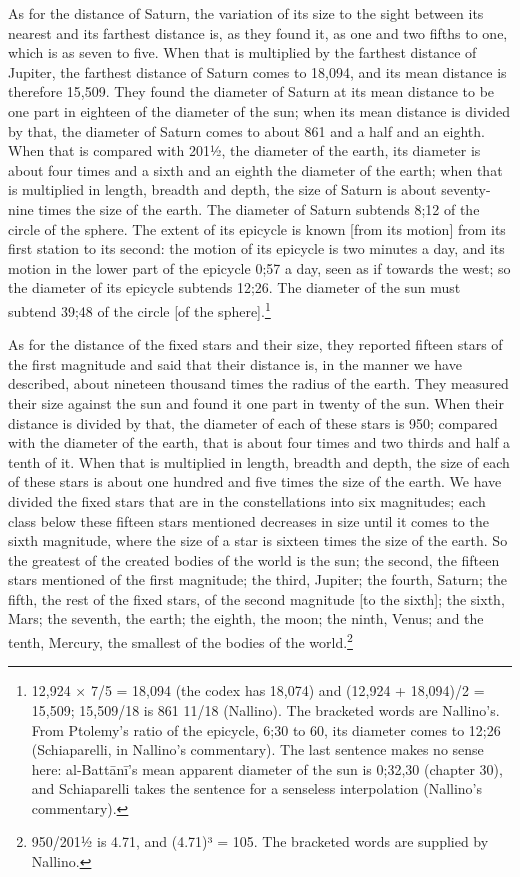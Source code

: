 \documentclass[11pt]{article}
\newcommand{\ArPage}[1]{\marginpar{\footnotesize\color{gray}Ar.\,p.\,#1}}
\begin{document}
\par \ArPage{185}As for the distance of Saturn, the variation of its size to the sight between its nearest and its farthest distance is, as they found it, as one and two fifths to one, which is as seven to five. When that is multiplied by the farthest distance of Jupiter, the farthest distance of Saturn comes to 18,094, and its mean distance is therefore 15,509. They found the diameter of Saturn at its mean distance to be one part in eighteen of the diameter of the sun; when its mean distance is divided by that, the diameter of Saturn comes to about 861 and a half and an eighth. When that is compared with 201½, the diameter of the earth, its diameter is about four times and a sixth and an eighth the diameter of the earth; when that is multiplied in length, breadth and depth, the size of Saturn is about seventy-nine times the size of the earth. The diameter of Saturn subtends 8;12 of the circle of the sphere. The extent of its epicycle is known [from its motion] from its first station to its second: the motion of its epicycle is two minutes a day, and its motion in the lower part of the epicycle 0;57 a day, seen as if towards the west; so the diameter of its epicycle subtends 12;26. The diameter of the sun must subtend 39;48 of the circle [of the sphere].\footnote{12,924 × 7/5 = 18,094 (the codex has 18,074) and (12,924 + 18,094)/2 = 15,509; 15,509/18 is 861 11/18 (Nallino). The bracketed words are Nallino's. From Ptolemy's ratio of the epicycle, 6;30 to 60, its diameter comes to 12;26 (Schiaparelli, in Nallino's commentary). The last sentence makes no sense here: al-Battānī's mean apparent diameter of the sun is 0;32,30 (chapter 30), and Schiaparelli takes the sentence for a senseless interpolation (Nallino's commentary).}\par
\par As for the distance of the fixed stars and their size, they reported fifteen stars of the first magnitude and said that their distance is, in the manner we have described, about nineteen thousand times the radius of the earth. They measured their size against the sun and found it one part in twenty of the sun. When their distance is divided by that, the diameter of each of these stars is 950; compared with the diameter of the earth, that is about four times and two thirds and half a tenth of it. When that is multiplied in length, breadth and depth, the size of each of these stars is about one hundred and five times the size of the earth. We have divided the fixed stars that are in the constellations into six magnitudes; each class below these fifteen stars mentioned decreases in size until it comes to the sixth magnitude, where the size of a star is sixteen times the size of the earth. So the greatest of the created bodies of the world is the sun; the second, the fifteen stars mentioned of the first magnitude; the third, Jupiter; the fourth, Saturn; the fifth, the rest of the fixed stars, of the second magnitude [to the sixth]; the sixth, Mars; the seventh, the earth; the eighth, the moon; the ninth, Venus; and the tenth, Mercury, the smallest of the bodies of the world.\footnote{950/201½ is 4.71, and (4.71)³ = 105. The bracketed words are supplied by Nallino.}\par
\end{document}
